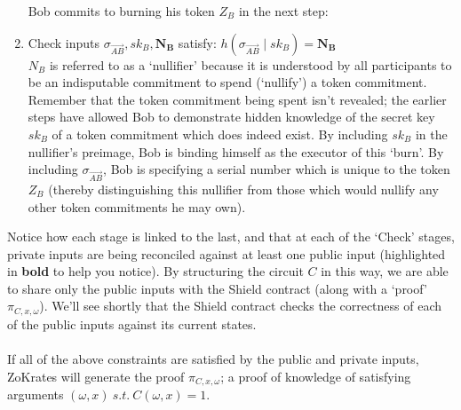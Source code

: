 \documentclass{article}
\begin{document}
\begin{enumerate}
  Bob commits to burning his token $Z_B$ in the next step:
  \item Check inputs $\sigma_{\vec{AB}}, sk_B, \bm{N_B}$ satisfy:
    $h(\sigma_{\vec{AB}}\;|\;sk_B) = \bm{N_{B}}$\\
    $N_B$ is referred to as a `nullifier' because it is understood by all participants to be an indisputable commitment to spend (`nullify') a token commitment. Remember that the token commitment being spent isn't revealed; the earlier steps have allowed Bob to demonstrate hidden knowledge of the secret key $sk_B$ of a token commitment which does indeed exist. By including $sk_B$ in the nullifier's preimage, Bob is binding himself as the executor of this `burn'. By including $\sigma_{\vec{AB}}$, Bob is specifying a serial number which is unique to the token $Z_B$ (thereby distinguishing this nullifier from those which would nullify any other token commitments he may own).
\end{enumerate}
Notice how each stage is linked to the last, and that at each of the `Check' stages, private inputs are being reconciled against at least one public input (highlighted in \textbf{bold} to help you notice). By structuring the circuit $C$ in this way, we are able to share only the public inputs with the Shield contract (along with a `proof' $\pi_{C,x,\omega}$). We'll see shortly that the Shield contract checks the correctness of each of the public inputs against its current states.\\
\\

\noindent
If all of the above constraints are satisfied by the public and private inputs, ZoKrates will generate the proof $\pi_{C,x,\omega}$; a proof of knowledge of satisfying arguments $(\omega, x) \ s.t. \ C(\omega, x) = 1$.
\end{document}
